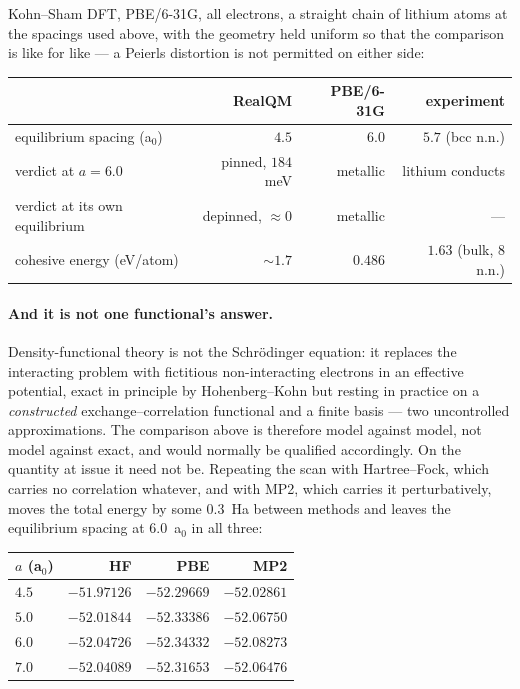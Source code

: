 \documentclass[11pt]{article}
\begin{document}
Kohn--Sham DFT, PBE/6-31G, all electrons, a straight chain of lithium atoms at the spacings used
above, with the geometry held uniform so that the comparison is like for like --- a Peierls
distortion is not permitted on either side:

\begin{center}
\small
\begin{tabular}{@{}lrrr@{}}
\toprule
 & RealQM & PBE/6-31G & experiment\\
\midrule
equilibrium spacing (a$_0$)      & $4.5$              & $6.0$    & $5.7$ (bcc n.n.)\\
verdict at $a=6.0$               & pinned, $184$~meV  & metallic & lithium conducts\\
verdict at its own equilibrium   & depinned, $\approx0$ & metallic & ---\\
cohesive energy (eV/atom)        & $\sim1.7$          & $0.486$  & $1.63$ (bulk, 8 n.n.)\\
\bottomrule
\end{tabular}
\end{center}

\paragraph{And it is not one functional's answer.} Density-functional theory is not the
Schr\"odinger equation: it replaces the interacting problem with fictitious non-interacting
electrons in an effective potential, exact in principle by Hohenberg--Kohn but resting in practice
on a \emph{constructed} exchange--correlation functional and a finite basis --- two uncontrolled
approximations. The comparison above is therefore model against model, not model against exact, and
would normally be qualified accordingly. On the quantity at issue it need not be. Repeating the
scan with Hartree--Fock, which carries no correlation whatever, and with MP2, which carries it
perturbatively, moves the total energy by some $0.3$~Ha between methods and leaves the equilibrium
spacing at $6.0$~a$_0$ in all three:

\begin{center}
\small
\begin{tabular}{@{}lrrr@{}}
\toprule
$a$ (a$_0$) & HF & PBE & MP2\\
\midrule
$4.5$ & $-51.97126$ & $-52.29669$ & $-52.02861$\\
$5.0$ & $-52.01844$ & $-52.33386$ & $-52.06750$\\
$6.0$ & $\mathbf{-52.04726}$ & $\mathbf{-52.34332}$ & $\mathbf{-52.08273}$\\
$7.0$ & $-52.04089$ & $-52.31653$ & $-52.06476$\\
\bottomrule
\end{tabular}
\end{center}
\end{document}
